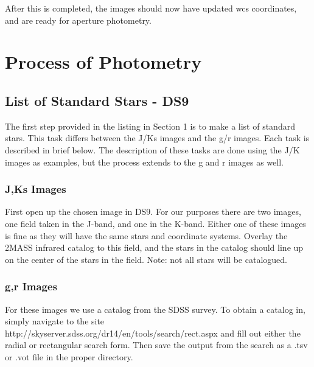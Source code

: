 \documentclass[a4paper]{article}
\begin{document}
After this is completed, the images should now have updated wcs coordinates, and are ready for aperture photometry.



\section{Process of Photometry}
\subsection{List of Standard Stars - DS9}
The first step provided in the listing in Section 1 is to make a list of standard stars.  This task differs between the J/Ks images and the g/r images.  Each task is described in brief below.  The description of these tasks are done using the J/K images as examples, but the process extends to the g and r images as well.
\subsubsection{J,Ks Images}
First open up the chosen image in DS9.  For our purposes there are two images, one field taken in the J-band, and one in the K-band.  Either one of these images is fine as they will have the same stars and coordinate systems.  Overlay the 2MASS infrared catalog to this field, and the stars in the catalog should line up on the center of the stars in the field.  Note: not all stars will be catalogued. 
\subsubsection{g,r Images}
For these images we use a catalog from the SDSS survey.  To obtain a catalog in,  simply navigate to the site http://skyserver.sdss.org/dr14/en/tools/search/rect.aspx and fill out either the radial or rectangular search form.  Then save the output from the search as a .tsv or .vot file in the proper directory. \\ \\
\end{document}
